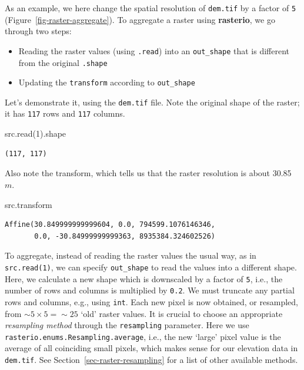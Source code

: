 \documentclass[
  letterpaper,
]{krantz}
\newenvironment{Shaded}{\begin{snugshade}}{\end{snugshade}}
\newcommand{\DecValTok}[1]{\textcolor[rgb]{0.68,0.00,0.00}{#1}}
\newcommand{\NormalTok}[1]{\textcolor[rgb]{0.00,0.23,0.31}{#1}}
\providecommand{\tightlist}{%
  \setlength{\itemsep}{0pt}\setlength{\parskip}{0pt}}\usepackage{longtable,booktabs,array}
\begin{document}
As an example, we here change the spatial resolution of \texttt{dem.tif}
by a factor of \texttt{5} (Figure~\ref{fig-raster-aggregate}). To
aggregate a raster using \textbf{rasterio}, we go through two steps:

\begin{itemize}
\tightlist
\item
  Reading the raster values (using \texttt{.read}) into an
  \texttt{out\_shape} that is different from the original
  \texttt{.shape}
\item
  Updating the \texttt{transform} according to \texttt{out\_shape}
\end{itemize}

Let's demonstrate it, using the \texttt{dem.tif} file. Note the original
shape of the raster; it has \texttt{117} rows and \texttt{117} columns.

\begin{Shaded}
\begin{Highlighting}[]
\NormalTok{src.read(}\DecValTok{1}\NormalTok{).shape}
\end{Highlighting}
\end{Shaded}

\begin{verbatim}
(117, 117)
\end{verbatim}

Also note the transform, which tells us that the raster resolution is
about 30.85 \(m\).

\begin{Shaded}
\begin{Highlighting}[]
\NormalTok{src.transform}
\end{Highlighting}
\end{Shaded}

\begin{verbatim}
Affine(30.849999999999604, 0.0, 794599.1076146346,
       0.0, -30.84999999999363, 8935384.324602526)
\end{verbatim}

To aggregate, instead of reading the raster values the usual way, as in
\texttt{src.read(1)}, we can specify \texttt{out\_shape} to read the
values into a different shape. Here, we calculate a new shape which is
downscaled by a factor of \texttt{5}, i.e., the number of rows and
columns is multiplied by \texttt{0.2}. We must truncate any partial rows
and columns, e.g., using \texttt{int}. Each new pixel is now obtained,
or resampled, from \(\sim 5 \times 5 = \sim 25\) `old' raster values. It
is crucial to choose an appropriate \emph{resampling method} through the
\texttt{resampling} parameter. Here we use
\texttt{rasterio.enums.Resampling.average}, i.e., the new `large' pixel
value is the average of all coinciding small pixels, which makes sense
for our elevation data in \texttt{dem.tif}. See
Section~\ref{sec-raster-resampling} for a list of other available
methods.
\end{document}
